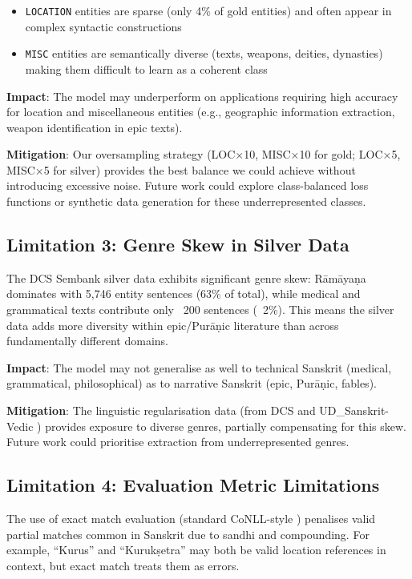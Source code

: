 \begin{itemize}
    \item \texttt{LOCATION} entities are sparse (only 4\% of gold entities) and often appear in complex syntactic constructions
    \item \texttt{MISC} entities are semantically diverse (texts, weapons, deities, dynasties) making them difficult to learn as a coherent class
\end{itemize}

\textbf{Impact}: The model may underperform on applications requiring high accuracy for location and miscellaneous entities (e.g., geographic information extraction, weapon identification in epic texts).

\textbf{Mitigation}: Our oversampling strategy \cite{chawla2002smote} (LOC×10, MISC×10 for gold; LOC×5, MISC×5 for silver) provides the best balance we could achieve without introducing excessive noise. Future work could explore class-balanced loss functions or synthetic data generation for these underrepresented classes.

\subsection{Limitation 3: Genre Skew in Silver Data}

The DCS Sembank \cite{hellwig2010dcs} silver data exhibits significant genre skew: R\={a}m\={a}ya\d{n}a dominates with 5,746 entity sentences (63\% of total), while medical and grammatical texts contribute only ~200 sentences (~2\%). This means the silver data adds more diversity within epic/Pur\={a}\d{n}ic literature than across fundamentally different domains.

\textbf{Impact}: The model may not generalise as well to technical Sanskrit (medical, grammatical, philosophical) as to narrative Sanskrit (epic, Purāṇic, fables).

\textbf{Mitigation}: The linguistic regularisation data (from DCS \cite{hellwig2010dcs} and UD\_Sanskrit-Vedic \cite{hellwig2020vedictreebank, rigveda}) provides exposure to diverse genres, partially compensating for this skew. Future work could prioritise extraction from underrepresented genres.

\subsection{Limitation 4: Evaluation Metric Limitations}

The use of exact match evaluation (standard CoNLL-style \cite{tjong2003conll}) penalises valid partial matches common in Sanskrit due to sandhi and compounding. For example, ``Kurus'' and ``Kuruk\d{s}etra'' may both be valid location references in context, but exact match treats them as errors.

